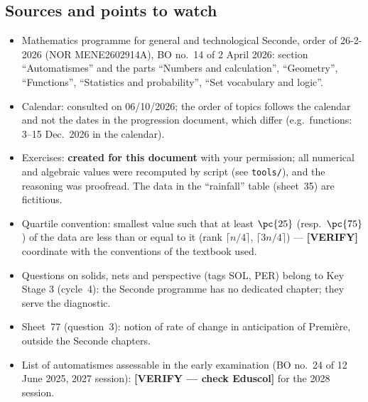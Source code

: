 \subsection*{Sources and points to watch}
\begin{itemize}[leftmargin=1.2em,itemsep=2pt]
  \item Mathematics programme for general and technological Seconde, order of 26-2-2026 (NOR MENE2602914A), BO no.~14 of 2 April 2026: section ``Automatismes'' and the parts ``Numbers and calculation'', ``Geometry'', ``Functions'', ``Statistics and probability'', ``Set vocabulary and logic''.
  \item Calendar: consulted on 06/10/2026; the order of topics follows the calendar and not the dates in the progression document, which differ (e.g.\ functions: 3--15 Dec.\ 2026 in the calendar).
  \item Exercises: \textbf{created for this document} with your permission; all numerical and algebraic values were recomputed by script (see \texttt{tools/}), and the reasoning was proofread. The data in the ``rainfall'' table (sheet~35) are fictitious.
  \item Quartile convention: smallest value such that at least $\pc{25}$ (resp.\ $\pc{75}$) of the data are less than or equal to it (rank $\lceil n/4\rceil$, $\lceil3n/4\rceil$) --- \textbf{[VERIFY]} coordinate with the conventions of the textbook used.
  \item Questions on solids, nets and perspective (tags SOL, PER) belong to Key Stage 3 (cycle~4): the Seconde programme has no dedicated chapter; they serve the diagnostic.
  \item Sheet~77 (question~3): notion of rate of change in anticipation of Première, outside the Seconde chapters.
  \item List of automatismes assessable in the early examination (BO no.~24 of 12 June 2025, 2027 session): \textbf{[VERIFY --- check Eduscol]} for the 2028 session.
\end{itemize}
